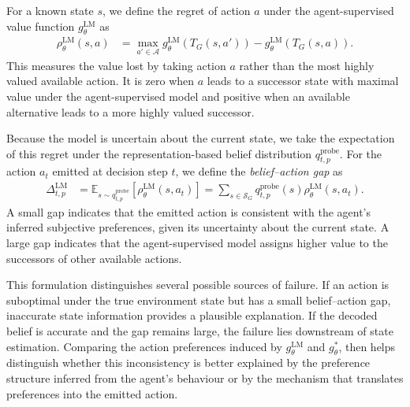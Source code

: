 \documentclass{article}
\begin{document}
For a known state $s$, we define the regret of action $a$ under the agent-supervised value function $g_\theta^{\mathrm{LM}}$ as
\begin{align}
    \rho_\theta^{\mathrm{LM}}(s,a)
    &=
    \max_{a' \in \mathcal A}
    g_\theta^{\mathrm{LM}}\!\left(T_G(s,a')\right)
    -
    g_\theta^{\mathrm{LM}}\!\left(T_G(s,a)\right).
    \label{eq:state-action-regret}
\end{align}
This measures the value lost by taking action $a$ rather than the most highly valued available action.
It is zero when $a$ leads to a successor state with maximal value under the agent-supervised model and positive when an available alternative leads to a more highly valued successor.

Because the model is uncertain about the current state, we take the expectation of this regret under the representation-based belief distribution $q_{t,p}^{\mathrm{probe}}$.
For the action $a_t$ emitted at decision step $t$, we define the \emph{belief--action gap} as
\begin{align}
    \Delta_{t,p}^{\mathrm{LM}}
    &=
    \mathbb{E}_{s \sim q_{t,p}^{\mathrm{probe}}}
    \left[
        \rho_\theta^{\mathrm{LM}}(s,a_t)
    \right] =
    \sum_{s \in \mathcal S_G}
    q_{t,p}^{\mathrm{probe}}(s)
    \rho_\theta^{\mathrm{LM}}(s,a_t).
    \label{eq:belief-action-gap}
\end{align}
A small gap indicates that the emitted action is consistent with the agent's inferred subjective preferences, given its uncertainty about the current state.
A large gap indicates that the agent-supervised model assigns higher value to the successors of other available actions.

This formulation distinguishes several possible sources of failure.
If an action is suboptimal under the true environment state but has a small belief--action gap, inaccurate state information provides a plausible explanation. 
If the decoded belief is accurate and the gap remains large, the failure lies downstream of state estimation. 
Comparing the action preferences induced by $g_\theta^{\mathrm{LM}}$ and $g_\theta^{*}$, then helps distinguish whether this inconsistency is better explained by the preference structure inferred from the agent's behaviour or by the mechanism that translates preferences into the emitted action.
\end{document}
